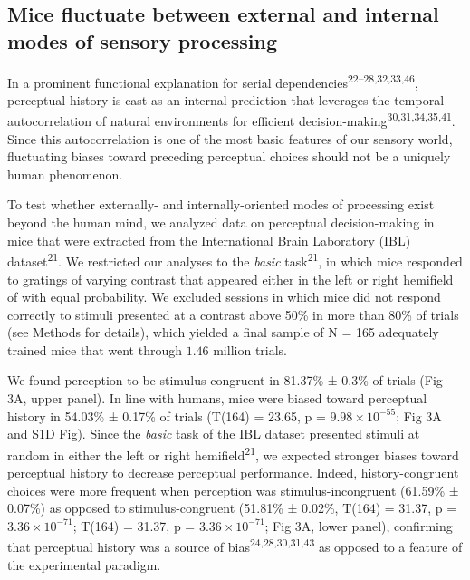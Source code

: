 \documentclass[
]{article}
\begin{document}
\hypertarget{mice-fluctuate-between-external-and-internal-modes-of-sensory-processing}{%
\subsection{Mice fluctuate between external and internal modes of
sensory
processing}\label{mice-fluctuate-between-external-and-internal-modes-of-sensory-processing}}

In a prominent functional explanation for serial
dependencies\textsuperscript{22--28,32,33,46}, perceptual history is
cast as an internal prediction that leverages the temporal
autocorrelation of natural environments for efficient
decision-making\textsuperscript{30,31,34,35,41}. Since this
autocorrelation is one of the most basic features of our sensory world,
fluctuating biases toward preceding perceptual choices should not be a
uniquely human phenomenon.

To test whether externally- and internally-oriented modes of processing
exist beyond the human mind, we analyzed data on perceptual
decision-making in mice that were extracted from the International Brain
Laboratory (IBL) dataset\textsuperscript{21}. We restricted our analyses
to the \emph{basic} task\textsuperscript{21}, in which mice responded to
gratings of varying contrast that appeared either in the left or right
hemifield of with equal probability. We excluded sessions in which mice
did not respond correctly to stimuli presented at a contrast above 50\%
in more than 80\% of trials (see Methods for details), which yielded a
final sample of N = 165 adequately trained mice that went through
\(1.46\) million trials.

We found perception to be stimulus-congruent in 81.37\% ± 0.3\% of
trials (Fig 3A, upper panel). In line with humans, mice were biased
toward perceptual history in 54.03\% ± 0.17\% of trials (T(164) = 23.65,
p = \(\ensuremath{9.98\times 10^{-55}}\); Fig 3A and S1D
Fig). Since the \emph{basic} task of the IBL dataset presented
stimuli at random in either the left or right
hemifield\textsuperscript{21}, we expected stronger biases toward
perceptual history to decrease perceptual performance. Indeed,
history-congruent choices were more frequent when perception was
stimulus-incongruent (61.59\% ± 0.07\%) as opposed to stimulus-congruent
(51.81\% ± 0.02\%, T(164) = 31.37, p =
\(\ensuremath{3.36\times 10^{-71}}\); T(164) = 31.37, p =
\(\ensuremath{3.36\times 10^{-71}}\); Fig 3A, lower panel),
confirming that perceptual history was a source of
bias\textsuperscript{24,28,30,31,43} as opposed to a feature of the
experimental paradigm.
\end{document}

